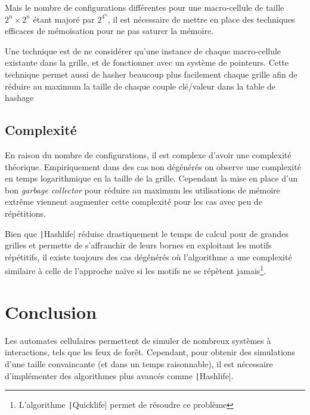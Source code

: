 \documentclass[12pt]{article}
\begin{document}
Mais le nombre de configurations différentes pour une macro-cellule de taille $2^{n} \times 2^{n}$ étant majoré par $2^{4^{n}}$, il est nécessaire de mettre en place des techniques efficaces de mémoïsation pour ne pas saturer la mémoire.

Une technique est de ne considérer qu'une instance de chaque macro-cellule existante dans la grille, et de fonctionner avec un système de pointeurs. Cette technique permet aussi de hasher beaucoup plus facilement chaque grille afin de réduire au maximum la taille de chaque couple clé/valeur dans la table de hashage

\subsection{Complexité}

En raison du nombre de configurations, il est complexe d'avoir une complexité théorique. Empiriquement dans des cas non dégénérés on observe une complexité en temps logarithmique en la taille de la grille. Cependant la mise en place d'un bon \textit{garbage collector} pour réduire au maximum les utilisations de mémoire extrême viennent augmenter cette complexité pour les cas avec peu de répétitions.

Bien que \texttt|Hashlife| réduise drastiquement le temps de calcul pour de grandes grilles et permette de s'affranchir de leurs bornes en exploitant les motifs répétitifs, il existe toujours des cas dégénérés où l'algorithme a une complexité similaire à celle de l'approche naïve si les motifs ne se répètent jamais\footnote{L'algorithme \texttt|Quicklife| permet de résoudre ce problème}.

\section{Conclusion}

Les automates cellulaires permettent de simuler de nombreux systèmes à interactions, tels que les feux de forêt. Cependant, pour obtenir des simulations d'une taille convaincante (et dans un temps raisonnable), il est nécessaire d'implémenter des algorithmes plus avancés comme \texttt|Hashlife|.


\end{document}
